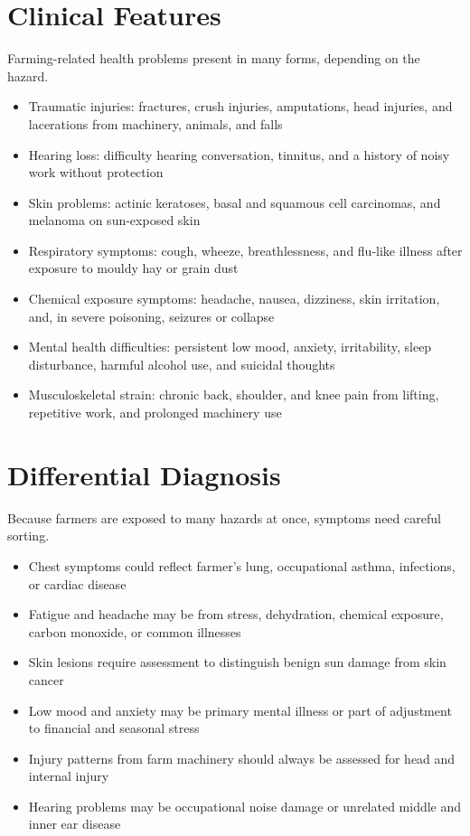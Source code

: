 \section*{Clinical Features}
Farming-related health problems present in many forms, depending on the hazard.
\begin{itemize}
    \item Traumatic injuries: fractures, crush injuries, amputations, head injuries, and lacerations from machinery, animals, and falls
    \item Hearing loss: difficulty hearing conversation, tinnitus, and a history of noisy work without protection
    \item Skin problems: actinic keratoses, basal and squamous cell carcinomas, and melanoma on sun-exposed skin
    \item Respiratory symptoms: cough, wheeze, breathlessness, and flu-like illness after exposure to mouldy hay or grain dust
    \item Chemical exposure symptoms: headache, nausea, dizziness, skin irritation, and, in severe poisoning, seizures or collapse
    \item Mental health difficulties: persistent low mood, anxiety, irritability, sleep disturbance, harmful alcohol use, and suicidal thoughts
    \item Musculoskeletal strain: chronic back, shoulder, and knee pain from lifting, repetitive work, and prolonged machinery use
\end{itemize}

\section*{Differential Diagnosis}
Because farmers are exposed to many hazards at once, symptoms need careful sorting.
\begin{itemize}
    \item Chest symptoms could reflect farmer's lung, occupational asthma, infections, or cardiac disease
    \item Fatigue and headache may be from stress, dehydration, chemical exposure, carbon monoxide, or common illnesses
    \item Skin lesions require assessment to distinguish benign sun damage from skin cancer
    \item Low mood and anxiety may be primary mental illness or part of adjustment to financial and seasonal stress
    \item Injury patterns from farm machinery should always be assessed for head and internal injury
    \item Hearing problems may be occupational noise damage or unrelated middle and inner ear disease
\end{itemize}

